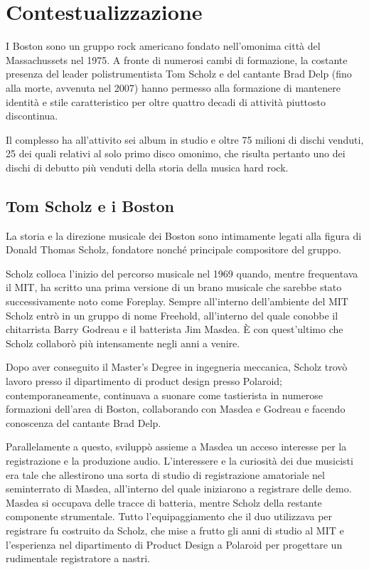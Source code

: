\documentclass[class=book, crop=false, oneside, 12pt]{standalone}
\begin{document}
\chapter{Contestualizzazione}
I Boston sono un gruppo rock americano fondato nell'omonima città del Massachussets nel 1975. A fronte di numerosi cambi di formazione, la costante presenza del leader polistrumentista Tom Scholz e del cantante Brad Delp (fino alla morte, avvenuta nel 2007) hanno permesso alla formazione di mantenere identità e stile caratteristico per oltre quattro decadi di attività piuttosto discontinua. 

Il complesso ha all'attivito sei album in studio e oltre 75 milioni di dischi venduti, 25 dei quali relativi al solo primo disco omonimo, che risulta pertanto uno dei dischi di debutto più venduti della storia della musica hard rock. 

\section{Tom Scholz e i Boston}
La storia e la direzione musicale dei Boston sono intimamente legati alla figura di Donald Thomas Scholz, fondatore nonché principale compositore del gruppo.

Scholz colloca l'inizio del percorso musicale nel 1969 quando, mentre frequentava il MIT, ha scritto una prima versione di un brano musicale che sarebbe stato successivamente noto come Foreplay\cite{wiki:bost_b}. Sempre all'interno dell'ambiente del MIT Scholz entrò in un gruppo di nome Freehold, all'interno del quale conobbe il chitarrista Barry Godreau e il batterista Jim Masdea. È con quest'ultimo che Scholz collaborò più intensamente negli anni a venire.

Dopo aver conseguito il Master's Degree in ingegneria meccanica, Scholz trovò lavoro presso il dipartimento di product design presso Polaroid; contemporaneamente, continuava a suonare come tastierista in numerose formazioni dell'area di Boston, collaborando con Masdea e Godreau e facendo conoscenza del cantante Brad Delp. 

Parallelamente a questo, sviluppò assieme a Masdea un acceso interesse per la registrazione e la produzione audio. L'interessere e la curiosità dei due musicisti era tale che allestirono una sorta di studio di registrazione amatoriale nel seminterrato di Masdea, all'interno del quale iniziarono a registrare delle demo. Masdea si occupava delle tracce di batteria, mentre Scholz della restante componente strumentale. Tutto l'equipaggiamento che il duo utilizzava per registrare fu costruito da Scholz, che mise a frutto gli anni di studio al MIT e l'esperienza nel dipartimento di Product Design a Polaroid per progettare un rudimentale registratore a nastri. 
\end{document}
